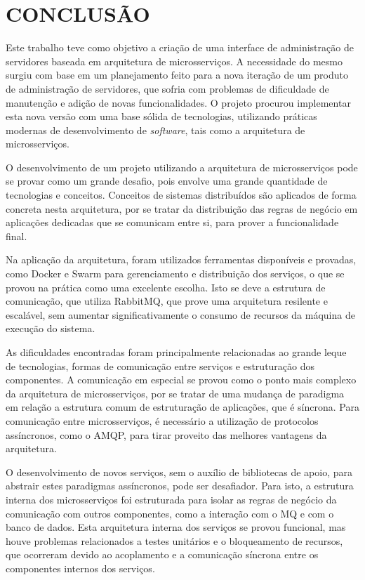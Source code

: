 \chapter{CONCLUSÃO}
\label{chp:conclusao}

Este trabalho teve como objetivo a criação de uma interface de administração
de servidores baseada em arquitetura de microsserviços. A necessidade do
mesmo surgiu com base em um planejamento feito para a nova iteração de um
produto de administração de servidores, que sofria com problemas de
dificuldade de manutenção e adição de novas funcionalidades. O projeto
procurou implementar esta nova versão com uma base sólida de tecnologias,
utilizando práticas modernas de desenvolvimento de \emph{software}, tais como
a arquitetura de microsserviços.

O desenvolvimento de um projeto utilizando a arquitetura de microsserviços
pode se provar como um grande desafio, pois envolve uma grande quantidade
de tecnologias e conceitos. Conceitos de sistemas distribuídos são aplicados
de forma concreta nesta arquitetura, por se tratar da distribuição das regras
de negócio em aplicações dedicadas que se comunicam entre si, para prover
a funcionalidade final.

Na aplicação da arquitetura, foram utilizados ferramentas disponíveis e
provadas, como Docker e Swarm para gerenciamento e distribuição dos serviços,
o que se provou na prática como uma excelente escolha. Isto se deve a
estrutura de comunicação, que utiliza RabbitMQ, que prove uma arquitetura
resilente e escalável, sem aumentar significativamente o consumo de recursos
da máquina de execução do sistema.

As dificuldades encontradas foram principalmente relacionadas ao grande leque
de tecnologias, formas de comunicação entre serviços e estruturação dos
componentes. A comunicação em especial se provou como o ponto mais complexo
da arquitetura de microsserviços, por se tratar de uma mudança de paradigma
em relação a estrutura comum de estruturação de aplicações, que é síncrona.
Para comunicação entre microsserviços, é necessário a utilização de protocolos
assíncronos, como o \ac{AMQP}, para tirar proveito das melhores vantagens
da arquitetura.

O desenvolvimento de novos serviços, sem o auxílio de bibliotecas de apoio,
para abstrair estes paradigmas assíncronos, pode ser desafiador. Para isto,
a estrutura interna dos microsserviços foi estruturada para isolar as regras
de negócio da comunicação com outros componentes, como a interação
com o \ac{MQ} e com o banco de dados. Esta arquitetura interna dos serviços
se provou funcional, mas houve problemas relacionados a testes unitários
e o bloqueamento de recursos, que ocorreram devido ao acoplamento e a
comunicação síncrona entre os componentes internos dos serviços.

